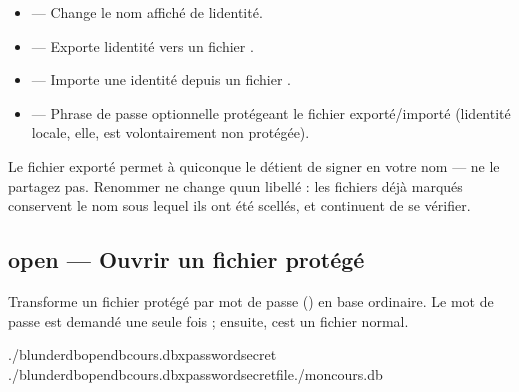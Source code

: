 \documentclass[letterpaper,10pt,dvipdfmx]{sphinxmanual}
\begin{document}
\sphinxAtStartPar
{}
\begin{itemize}
\item {} 
\sphinxAtStartPar
{} — Change le nom affiché de l\textquotesingle{}identité.

\item {} 
\sphinxAtStartPar
{} — Exporte l\textquotesingle{}identité vers un fichier .

\item {} 
\sphinxAtStartPar
{} — Importe une identité depuis un fichier .

\item {} 
\sphinxAtStartPar
{} — Phrase de passe optionnelle protégeant le fichier
exporté/importé (l\textquotesingle{}identité locale, elle, est volontairement non protégée).

\end{itemize}

\sphinxAtStartPar
Le fichier exporté permet à quiconque le détient de signer en votre nom — ne
le partagez pas. Renommer ne change qu\textquotesingle{}un libellé : les fichiers déjà marqués
conservent le nom sous lequel ils ont été scellés, et continuent de se
vérifier.


\subsection{open — Ouvrir un fichier protégé}
\label{\detokenize{cli:open-ouvrir-un-fichier-protege}}
\sphinxAtStartPar
Transforme un fichier protégé par mot de passe () en base ordinaire.
Le mot de passe est demandé une seule fois ; ensuite, c\textquotesingle{}est un fichier normal.

\begin{sphinxVerbatim}[commandchars=\\\{\}]
./blunderdbopen\PYGZhy{}\PYGZhy{}dbcours.dbx\PYGZhy{}\PYGZhy{}passwordsecret
./blunderdbopen\PYGZhy{}\PYGZhy{}dbcours.dbx\PYGZhy{}\PYGZhy{}passwordsecret\PYGZhy{}\PYGZhy{}file./mon\PYGZhy{}cours.db
\end{sphinxVerbatim}
\end{document}
